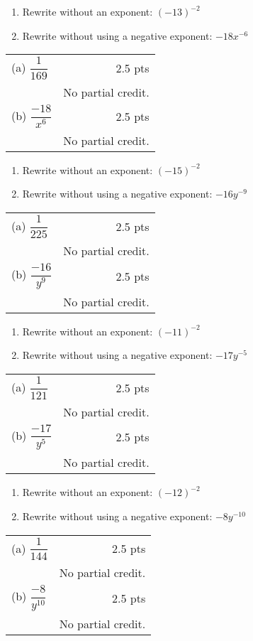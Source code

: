 {
	\begin{enumerate}
	\item Rewrite without an exponent: $(-13)^{-2}$
	\begin{onlyproblem}\spc\end{onlyproblem}
	\item Rewrite without using a negative exponent: $-18x^{-6}$
	\end{enumerate}
}
{
	\begin{tabular}{l r}
	(a) $\dfrac{1}{169}$ & 2.5 pts\\
	& No partial credit.\\
	(b) $\dfrac{-18}{x^6}$ & 2.5 pts\\
	& No partial credit.
	\end{tabular}
}

{
	\begin{enumerate}
	\item Rewrite without an exponent: $(-15)^{-2}$
	\begin{onlyproblem}\spc\end{onlyproblem}
	\item Rewrite without using a negative exponent: $-16y^{-9}$
	\end{enumerate}
}
{
	\begin{tabular}{l r}
	(a) $\dfrac{1}{225}$ & 2.5 pts\\
	& No partial credit.\\
	(b) $\dfrac{-16}{y^9}$ & 2.5 pts\\
	& No partial credit.
	\end{tabular}
}

{
	\begin{enumerate}
	\item Rewrite without an exponent: $(-11)^{-2}$
	\begin{onlyproblem}\spc\end{onlyproblem}
	\item Rewrite without using a negative exponent: $-17y^{-5}$
	\end{enumerate}
}
{
	\begin{tabular}{l r}
	(a) $\dfrac{1}{121}$ & 2.5 pts\\
	& No partial credit.\\
	(b) $\dfrac{-17}{y^5}$ & 2.5 pts\\
	& No partial credit.
	\end{tabular}
}

{
	\begin{enumerate}
	\item Rewrite without an exponent: $(-12)^{-2}$
	\begin{onlyproblem}\spc\end{onlyproblem}
	\item Rewrite without using a negative exponent: $-8y^{-10}$
	\end{enumerate}
}
{
	\begin{tabular}{l r}
	(a) $\dfrac{1}{144}$ & 2.5 pts\\
	& No partial credit.\\
	(b) $\dfrac{-8}{y^{10}}$ & 2.5 pts\\
	& No partial credit.
	\end{tabular}
}
